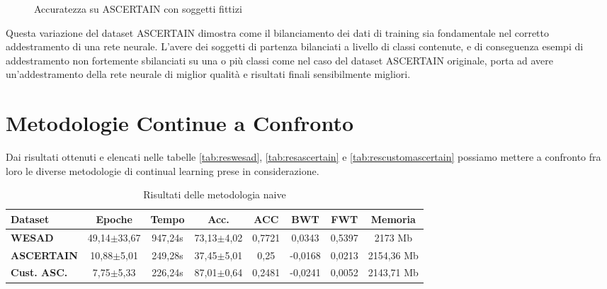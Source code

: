 \begin{figure}[!tbp]
\begin{minipage}[b]{0.5\textwidth}
		\caption{Accuratezza su ASCERTAIN con soggetti fittizi}
		\label{fig:customascertain_accuracy_graph}
	\end{minipage}
\end{figure}
Questa variazione del dataset ASCERTAIN dimostra come il bilanciamento dei dati di training sia fondamentale nel corretto addestramento di una rete neurale. L'avere dei soggetti di partenza bilanciati a livello di classi contenute, e di conseguenza esempi di addestramento non fortemente sbilanciati su una o più classi come nel caso del dataset ASCERTAIN originale, porta ad avere un'addestramento della rete neurale di miglior qualità e risultati finali sensibilmente migliori.
\section{Metodologie Continue a Confronto}
Dai risultati ottenuti e elencati nelle tabelle \ref{tab:reswesad}, \ref{tab:resascertain} e \ref{tab:rescustomascertain} possiamo mettere a confronto fra loro le diverse metodologie di continual learning prese in considerazione.

\begin{table}[h]
\footnotesize
    \begin{tabular}{l|c|c|c|c|c|c|c}
        \textbf{Dataset} & \textbf{Epoche} & \textbf{Tempo} & \textbf{Acc.} & \textbf{ACC} & \textbf{BWT} & \textbf{FWT} & \textbf{Memoria}\\
        \hline
        \textbf{WESAD} & 49,14$\pm$33,67 & 947,24s & 73,13$\pm$4,02 & 0,7721 & 0,0343 & 0,5397 & 2173 Mb\\
        \textbf{ASCERTAIN} & 10,88$\pm$5,01 & 249,28s & 37,45$\pm$5,01 & 0,25 & -0,0168 & 0,0213 & 2154,36 Mb\\
        \textbf{Cust. ASC.} & 7,75$\pm$5,33 & 226,24s & 87,01$\pm$0,64 & 0,2481 & -0,0241 & 0,0052 & 2143,71 Mb\\
    \end{tabular}
    \caption{Risultati delle metodologia naive}
    \label{tab:rescontinual}
\end{table}

